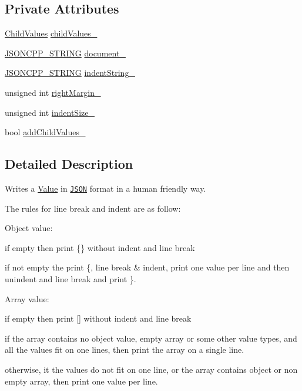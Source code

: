 \subsection*{Private Attributes}
\begin{DoxyCompactItemize}
\item 
\hyperlink{class_json_1_1_styled_writer_a798fcefa41730de612a5cf7e73003e8a}{Child\+Values} \hyperlink{class_json_1_1_styled_writer_a1f905495f0705365af117ec541e29fdf}{child\+Values\+\_\+}
\item 
\hyperlink{config_8h_a1e723f95759de062585bc4a8fd3fa4be}{J\+S\+O\+N\+C\+P\+P\+\_\+\+S\+T\+R\+I\+NG} \hyperlink{class_json_1_1_styled_writer_ae967b0c77e4d7cb889ce7b6ee4ce28d7}{document\+\_\+}
\item 
\hyperlink{config_8h_a1e723f95759de062585bc4a8fd3fa4be}{J\+S\+O\+N\+C\+P\+P\+\_\+\+S\+T\+R\+I\+NG} \hyperlink{class_json_1_1_styled_writer_a7d91709c94c152bd44eaf80faac130ae}{indent\+String\+\_\+}
\item 
unsigned int \hyperlink{class_json_1_1_styled_writer_ae648d2e1fc0f7d45c748c96805106cb0}{right\+Margin\+\_\+}
\item 
unsigned int \hyperlink{class_json_1_1_styled_writer_a0b5ab768cc56433d463eb1f03da8614e}{indent\+Size\+\_\+}
\item 
bool \hyperlink{class_json_1_1_styled_writer_acaabfa48b50a8bb7fa9ce98e2ae971d9}{add\+Child\+Values\+\_\+}
\end{DoxyCompactItemize}


\subsection{Detailed Description}
Writes a \hyperlink{class_json_1_1_value}{Value} in \href{http://www.json.org}{\tt J\+S\+ON} format in a human friendly way. 

The rules for line break and indent are as follow\+:
\begin{DoxyItemize}
\item Object value\+:
\begin{DoxyItemize}
\item if empty then print \{\} without indent and line break
\item if not empty the print \textquotesingle{}\{\textquotesingle{}, line break \& indent, print one value per line and then unindent and line break and print \textquotesingle{}\}\textquotesingle{}.
\end{DoxyItemize}
\item Array value\+:
\begin{DoxyItemize}
\item if empty then print \mbox{[}\mbox{]} without indent and line break
\item if the array contains no object value, empty array or some other value types, and all the values fit on one lines, then print the array on a single line.
\item otherwise, it the values do not fit on one line, or the array contains object or non empty array, then print one value per line.
\end{DoxyItemize}
\end{DoxyItemize}

